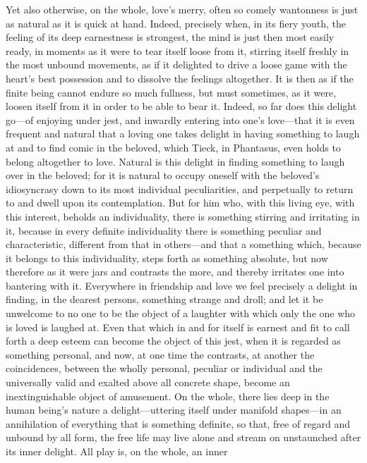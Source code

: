 \documentclass[12pt,a4paper]{book}
\begin{document}
Yet also otherwise, on the whole, love's merry, often so comely wantonness
is just as natural as it is quick at hand. Indeed, precisely when, in its
fiery youth, the feeling of its deep earnestness is strongest, the mind is
just then most easily ready, in moments as it were to tear itself loose
from it, stirring itself freshly in the most unbound movements, as if it
delighted to drive a loose game with the heart's best possession and to
dissolve the feelings altogether. It is then as if the finite being cannot
endure so much fullness, but must sometimes, as it were, loosen itself from
it in order to be able to bear it. Indeed, so far does this delight go---of
enjoying under jest, and inwardly entering into one's love---that it is even
frequent and natural that a loving one takes delight in having something to
laugh at and to find comic in the beloved, which Tieck, in Phantasus, even
holds to belong altogether to love. Natural is this delight in finding
something to laugh over in the beloved; for it is natural to occupy oneself
with the beloved's idiosyncrasy down to its most individual peculiarities,
and perpetually to return to and dwell upon its contemplation. But for him
who, with this living eye, with this interest, beholds an individuality,
there is something stirring and irritating in it, because in every definite
individuality there is something peculiar and characteristic, different from
that in others---and that a something which, because it belongs to this
individuality, steps forth as something absolute, but now therefore as it
were jars and contrasts the more, and thereby irritates one into bantering with it. Everywhere in
friendship and love we feel precisely a delight in finding, in the dearest
persons, something strange and droll; and let it be unwelcome to no one to
be the object of a laughter with which only the one who is loved is laughed
at. Even that which in and for itself is earnest and fit to call forth a
deep esteem can become the object of this jest, when it is regarded as
something personal, and now, at one time the contrasts, at another the
coincidences, between the wholly personal, peculiar or individual and the
universally valid and exalted above all concrete shape, become an
inextinguishable object of amusement. On the whole, there lies deep in the
human being's nature a delight---uttering itself under manifold shapes---in
an annihilation of everything that is something definite, so that, free of
regard and unbound by all form, the free life may live alone and stream on
unstaunched after its inner delight. All play is, on the whole, an inner
\end{document}
